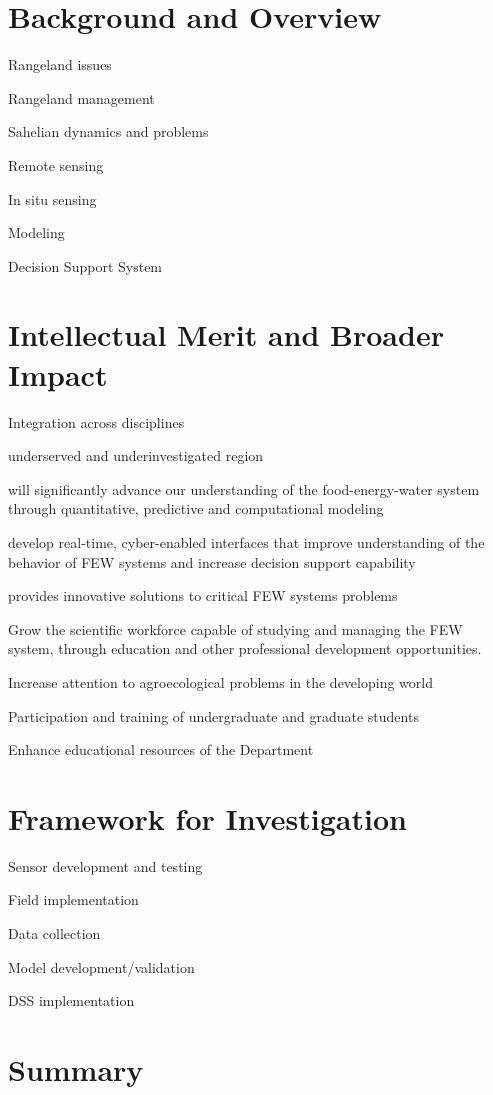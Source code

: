 
\section{Background and Overview}
Rangeland issues


Rangeland management


Sahelian dynamics and problems


Remote sensing


In situ sensing


Modeling


Decision Support System



\section{Intellectual Merit and Broader Impact}

Integration across disciplines


underserved and underinvestigated region


will significantly advance our understanding of the food-energy-water system through quantitative, predictive and computational modeling


develop real-time, cyber-enabled interfaces that improve understanding of the behavior of FEW systems and increase decision support capability

provides innovative solutions to critical FEW systems problems

Grow the scientific workforce capable of studying and managing the FEW system, through education and other professional development opportunities.


Increase attention to agroecological problems in the developing world


Participation and training of undergraduate and graduate students


Enhance educational resources of the Department

\section{Framework for Investigation}

Sensor development and testing


Field implementation


Data collection


Model development/validation


DSS implementation

\section{Summary}
